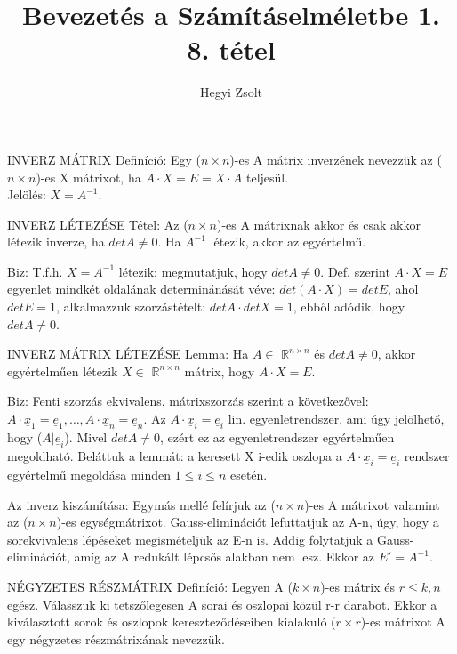 \documentclass[]{article}
\title{Bevezetés a Számításelméletbe 1.\\{\large 8. tétel}}
\author{Hegyi Zsolt}
\newcommand{\Rn}[1]{$\mathbb{R}^{#1}$}
\newcommand{\Und}[1]{\underline{#1}}
\begin{document}
\maketitle{}
\begin{shaded}
INVERZ MÁTRIX Definíció: Egy ($n \times n$)-es A mátrix inverzének nevezzük az ($n \times n$)-es X mátrixot, ha $A \cdot X = E = X \cdot A$ teljesül.\\
Jelölés: $X = A^{-1}$.
\end{shaded}
\begin{framed}
INVERZ LÉTEZÉSE Tétel: Az ($n \times n$)-es A mátrixnak akkor és csak akkor létezik inverze, ha $detA \neq 0$. Ha $A^{-1}$ létezik, akkor az egyértelmű.
\end{framed}
\begin{leftbar}
Biz: T.f.h. $X = A^{-1}$ létezik: megmutatjuk, hogy $detA \neq 0$. Def. szerint $A \cdot X = E$ egyenlet mindkét oldalának determinánását véve: $det(A \cdot X) = detE$, ahol $detE = 1$, alkalmazzuk szorzástételt: $detA \cdot detX = 1$, ebből adódik, hogy $detA \neq 0$.
\end{leftbar}
\begin{framed}
INVERZ MÁTRIX LÉTEZÉSE Lemma: Ha $A \in$ \Rn{n \times n} és $detA \neq 0$, akkor egyértelműen létezik $X \in$ \Rn{n \times n} mátrix, hogy $A \cdot X = E$.
\end{framed}
\begin{leftbar}
Biz: Fenti szorzás ekvivalens, mátrixszorzás szerint a következővel: $A \cdot \Und{x}_1 = \Und{e}_1, \ldots, A \cdot \Und{x}_n = \Und{e}_n$. Az $A\cdot \Und{x}_i = \Und{e}_i$ lin. egyenletrendszer, ami úgy jelölhető, hogy ($A|\Und{e}_i$). Mivel $detA \neq 0$, ezért ez az egyenletrendszer egyértelműen megoldható. Beláttuk a lemmát: a keresett X i-edik oszlopa a $A\cdot \Und{x}_i = \Und{e}_i$ rendszer egyértelmű megoldása minden $1 \leq i \leq n$ esetén.
\end{leftbar}
Az inverz kiszámítása: Egymás mellé felírjuk az ($n \times n$)-es A mátrixot valamint az ($n \times n$)-es egységmátrixot. Gauss-eliminációt lefuttatjuk az A-n, úgy, hogy a sorekvivalens lépéseket megismételjük az E-n is. Addig folytatjuk a Gauss-eliminációt, amíg az A redukált lépcsős alakban nem lesz. Ekkor az $E' = A^{-1}$.
\begin{shaded}
NÉGYZETES RÉSZMÁTRIX Definíció: Legyen A ($k \times n$)-es mátrix és $r \leq k,n$ egész. Válasszuk ki tetszőlegesen A sorai és oszlopai közül r-r darabot. Ekkor a kiválasztott sorok és oszlopok kereszteződéseiben kialakuló ($r \times r$)-es mátrixot A egy négyzetes részmátrixának nevezzük.
\end{shaded}
\end{document}
